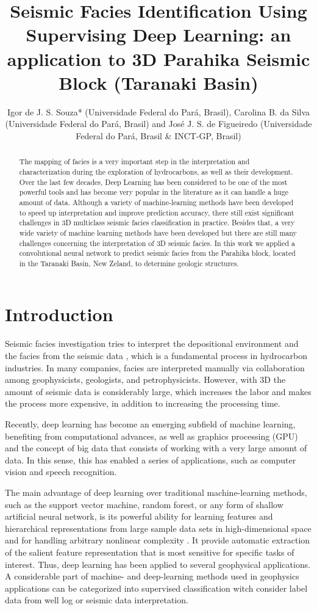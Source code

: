\documentclass[twoside,letterpaper,twocolumn]{article}
\title{Seismic Facies Identification Using Supervising Deep Learning: an application to 3D Parahika Seismic Block (Taranaki Basin)}
\author{Igor de J. S. Souza* (Universidade Federal do Pará, Brasil), Carolina B. da Silva (Universidade Federal do Pará, Brasil) and José J. S. de Figueiredo (Universidade Federal do Pará, Brasil \& INCT-GP, Brasil)}
\begin{document}
\maketitle

\begin{abstract}
The mapping of facies is a very important step in the interpretation and characterization during the exploration of hydrocarbons, as well as their development. 
Over the last few decades, Deep Learning has been considered to be one of the most powerful tools and has become very popular in the literature as it can handle a huge amount of data. 
Although a variety of machine-learning methods have been developed to speed up interpretation and improve prediction accuracy, there still exist significant challenges in 3D multiclass seismic facies classification in practice. 
Besides that, a very wide variety of machine learning methods have been developed but there are still many challenges concerning the interpretation of 3D seismic facies. In this work we applied a convolutional neural network to predict seismic facies from the Parahika block, located in the Taranaki Basin, New Zeland, to determine geologic structures.

\end{abstract}

\section{Introduction}
Seismic facies investigation tries to interpret the depositional environment and the facies from the seismic data \citep{dumay(1988)}, which is a fundamental process in hydrocarbon industries. 
In many companies, facies are interpreted manually via collaboration among geophysicists, geologists, and petrophysicists. 
However, with 3D the amount of seismic data is considerably large, which increases the labor and makes the process more expensive, in addition to increasing the processing time.

Recently, deep learning has become an emerging subfield of machine learning, benefiting from computational advances, as well as graphics processing (GPU) and the concept of big data that consists of working with a very large amount of data. In this sense, this has enabled a series of applications, such as computer vision and speech recognition. 

The main advantage of deep learning over traditional machine-learning methods, such as the support vector machine, random forest, or any form of shallow artificial neural network, is its powerful ability for learning features and hierarchical representations from large sample data sets in high-dimensional space and for handling arbitrary nonlinear complexity \citep{liu(2020)}. 
It provide automatic extraction of the salient feature representation that is most sensitive for specific tasks of interest. 
Thus, deep learning has been applied to several geophysical applications.
A considerable part of machine- and deep-learning methods used in geophysics applications can be categorized into supervised classification witch consider label data from well log or seismic data interpretation.
\end{document}
